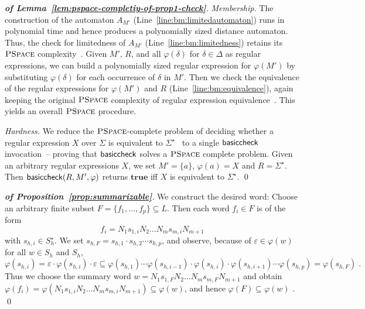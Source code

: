 \documentclass[envcountsame]{llncs}
\newcommand{\PSPACE}{\complexityclass{PSpace}}
\newcommand{\complexityclass}[1]{\ensuremath{\textsc{#1}}\xspace}
\newcommand{\basiccheck}{\ensuremath{{\sf basiccheck}}\xspace}
\newcommand{\boolTrue}{\ensuremath{\mathbf{true}}\xspace}
\begin{document}
\begin{proof}[\textbf{of Lemma~\ref{lem:pspace-completiy-of-prop1-check}}]
  \emph{Membership.} 
The construction of the automaton $A_{M'}$
  (Line~\ref{line:bm:limitedautomaton}) runs in polynomial time and
  hence produces a polynomially sized distance automaton. 
Thus, the check for limitedness of $A_{M'}$
  (Line~\ref{line:bm:limitedness}) retains its \PSPACE
  complexity~\cite{DBLP:conf/focs/MeyerS72}.
Given $M'$, $R$, and all $\varphi(\delta)$ for $\delta\in\Delta$ as
  regular expressions, we can build a polynomially sized regular
  expression for $\varphi(M')$ by substituting $\varphi(\delta)$ for
  each occurrence of $\delta$ in $M'$.
Then we check the equivalence of the regular expressions for
  $\varphi(M')$ and $R$ (Line~\ref{line:bm:equivalence}), again
  keeping the original \PSPACE complexity of regular expression
  equivalence~\cite{DBLP:conf/focs/MeyerS72}.
This yields an overall \PSPACE procedure.



  \emph{Hardness.} 
We reduce the \PSPACE-complete problem of deciding whether a regular
  expression $X$ over $\Sigma$ is equivalent to
  $\Sigma^\star$~\cite{DBLP:conf/focs/MeyerS72} to a single
  \basiccheck invocation~-- proving that \basiccheck solves a \PSPACE
  complete problem.
Given an arbitrary regular expressions $X$, we set $M'=\{a\}$,
  $\varphi(a)=X$ and $R=\Sigma^\star$. Then
  $\basiccheck(R,M',\varphi)$ returns \boolTrue iff $X$ is equivalent
  to $\Sigma^\star$.
\qed
\end{proof}


\begin{proof}[\textbf{of Proposition~\ref{prop:summarizable}}]
  We construct  the desired word:
Choose an arbitrary finite subset $F=\{f_1,\dots,f_p\}\subseteq L$. 
Then each word $f_i\in F$ is of the form
  $$f_i=N_1s_{1, i}N_2\dots N_ms_{m,i}N_{m+1}$$ with
  $s_{h,i}\in S_h^\star$.
We set $s_{h,F}=s_{h,1}\cdot s_{h,2}\cdots s_{h,p}$, and
  observe, because of $\varepsilon\in \varphi(w)$ for all $w\in S_h$
  and $S_h$,
  $$\varphi(s_{h,i})= \varepsilon\cdot\varphi(s_{h,i})\cdot\varepsilon\subseteq
  \varphi(s_{h,{1}})\cdots\varphi(s_{h,{i-1}})\cdot
  \varphi(s_{h,i})\cdot\varphi(s_{h,{i+1}})\cdots\varphi(s_{h,p})=
  \varphi(s_{h,F})\;.$$
Thus we choose the summary word $w=N_1s_{1,F}N_2\dots
  N_ms_{m, F}N_{m+1}$ and obtain
  $\varphi(f_i)=\varphi(N_1s_{1,i}N_2\dots
  N_ms_{m,i}N_{m+1})\subseteq \varphi(w)$, and hence
  $\varphi(F)\subseteq\varphi(w)$ .
\qed
\end{proof}
\end{document}
